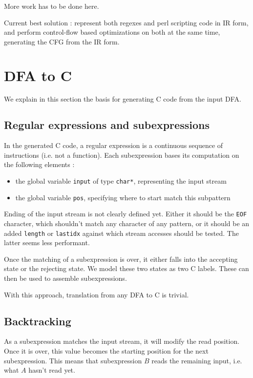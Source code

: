 \documentclass[11pt,a4paper]{report}
\newcommand{\ccode}[1]{\texttt{#1}}
\begin{document}
More work has to be done here.

Current best solution : represent both regexes and perl scripting code in IR form, and perform control-flow based optimizations on both at the same time, generating the CFG from the IR form.

\section{DFA to C}

We explain in this section the basis for generating C code from the input DFA.

\subsection{Regular expressions and subexpressions}

In the generated C code, a regular expression is a continuous sequence of instructions (i.e. not a function). Each subexpression bases its computation on the following elements :
\begin{itemize}
\item the global variable \ccode{input} of type \ccode{char*}, representing the input stream
\item the global variable \ccode{pos}, specifying where to start match this subpattern
\end{itemize}

Ending of the input stream is not clearly defined yet. Either it should be the \texttt{EOF} character, which shouldn't match any character of any pattern, or it should be an added \ccode{length} or \ccode{lastidx} against which stream accesses should be tested. The latter seems less performant.

Once the matching of a subexpression is over, it either falls into the accepting state or the rejecting state. We model these two states as two C labels. These can then be used to assemble subexpressions.

With this approach, translation from any DFA to C is trivial.

\subsection{Backtracking}

As a subexpression matches the input stream, it will modify the read position. Once it is over, this value becomes the starting position for the next subexpression. This means that subexpression $B$ reads the remaining input, i.e. what $A$ hasn't read yet.
\end{document}
